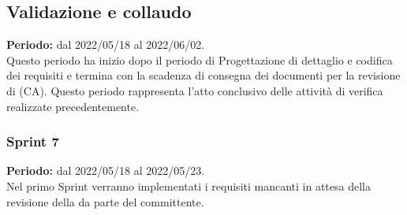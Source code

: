 
\subsection{Validazione e collaudo} \label{subsection:pianificazione_validazione}
\textbf{Periodo:} dal 2022/05/18 al 2022/06/02.
\bigskip
\\Questo periodo ha inizio dopo il periodo di Progettazione di dettaglio e codifica dei requisiti e termina con la scadenza di consegna dei documenti per la revisione di \CA{} (CA\glo{}).
Questo periodo rappresenta l'atto conclusivo delle attività di verifica realizzate precedentemente.
\subsubsection{Sprint 7} \label{subsubsection:sprint_7}
\textbf{Periodo:} dal 2022/05/18 al 2022/05/23.
\bigskip
\\Nel primo Sprint\glo{} verranno implementati i requisiti mancanti in attesa della revisione della \PB{} da parte del committente.
